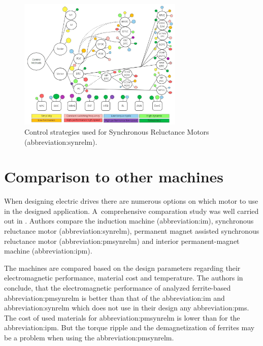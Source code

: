 \documentclass[a4paper, twoside, 11pt]{article}
\begin{document}
        \begin{figure}[htbp!]
            \centering
            \includegraphics[width=0.70\textwidth]{src/png/control-strategies-diagram.png}
            \caption{Control strategies used for Synchronous Reluctance Motors (\gls{abbreviation:synrelm}). \cite{heidari-a-review-of-synchronour-relucatence-motor-drive-advancements}}
            \label{fig:control-strategies-diagram}
        \end{figure}

\section{Comparison to other machines}
    When designing electric drives there are numerous options on which motor to use in the designed application. A~comprehensive comparation study was well carried out in \cite{zhang-Comprehensive-Comparative-Study-on-Permanent-Magnet-Assisted-Synchronous-Reluctance-Motors-and-Other-Types-of-Motor}. Authors compare the induction machine (\gls{abbreviation:im}), synchronous reluctance motor (\gls{abbreviation:synrelm}), permanent magnet assisted synchronous reluctance motor (\gls{abbreviation:pmsynrelm}) and interior permanent-magnet machine (\gls{abbreviation:ipm}).\par
    The machines are compared based on the design parameters regarding their electromagnetic performance, material cost and temperature. The authors in \cite{zhang-Comprehensive-Comparative-Study-on-Permanent-Magnet-Assisted-Synchronous-Reluctance-Motors-and-Other-Types-of-Motor} conclude, that the electromagnetic performance of analyzed ferrite-based \gls{abbreviation:pmsynrelm} is better than that of the \gls{abbreviation:im} and \gls{abbreviation:synrelm} which does not use in their design any \gls{abbreviation:pm}s. The cost of used materials for \gls{abbreviation:pmsynrelm} is lower than for the \gls{abbreviation:ipm}. But the torque ripple and the demagnetization of ferrites may be a problem when using the \gls{abbreviation:pmsynrelm}. \cite{zhang-Comprehensive-Comparative-Study-on-Permanent-Magnet-Assisted-Synchronous-Reluctance-Motors-and-Other-Types-of-Motor}
\end{document}
